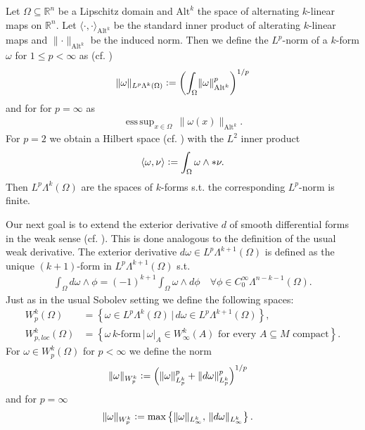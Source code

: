 \documentclass[12pt,a4paper]{article}
\theoremstyle{definition}
\DeclareMathOperator*{\esssup}{ess\,sup}
\newcommand{\norm}[1]{\lVert #1 \rVert}
\newcommand{\real}{\mathbb{R}}
\begin{document}
Let $\Omega \subseteq \real^n$ be a Lipschitz domain and $\text{Alt}^k$ 
the space of alternating $k$-linear maps on $\real^n$. 
Let $\langle \cdot,\cdot\rangle_{\text{Alt}^k}$ be the standard inner
product of alterating $k$-linear maps and 
$\lVert \cdot \rVert _{\text{Alt}^k}$ be the induced norm. Then
we define the $L^p$-norm of a $k$-form $\omega$ for $1\leq p < \infty$
as (cf. \cite{goldshtein})
\begin{align*}
\lVert \omega \rVert _{L^p\Lambda^k(\Omega)}\vcentcolon=
\left(\int_\Omega \lVert \omega \rVert _{\text{Alt}^k}^p \right)^{1/p}
\end{align*}
and for for $p=\infty$ as
\begin{align*}
\esssup_{x\in \Omega} \, \lVert \omega(x) \rVert _{{\text{Alt}^k}}.
\end{align*}
For $p=2$ we obtain a Hilbert space (cf. \cite[Sec. 6.2.6]{arnold}) 
with the $L^2$ inner product  
\begin{align*}
\langle \omega, \nu \rangle \vcentcolon= \int_\Omega \omega \wedge *\nu.
\end{align*}
Then $L^p\Lambda^k(\Omega)$ are the spaces of $k$-forms 
s.t. the corresponding $L^p$-norm is finite. \par

Our next goal is to extend the exterior derivative $d$ 
of smooth differential forms in the weak sense (cf. \cite{goldshtein}). 
This is done analogous to the definition of the usual weak derivative.
The exterior derivative $d\omega \in L^p\Lambda^{k+1}(\Omega)$ is defined as
the unique $(k+1)$-form in $L^p\Lambda^{k+1}(\Omega)$ s.t. 
\begin{align*}
\int_\Omega d\omega \wedge \phi = (-1)^{k+1}\int_\Omega \omega \wedge d\phi
\quad \forall \phi \in C_0^\infty \Lambda^{n-k-1}(\Omega).
\end{align*}
Just as in the usual Sobolev setting we define the following spaces:
\begin{align*}
W^k_p(\Omega) &= \left\{ \omega \in L^p\Lambda^k(\Omega)\, | 
\, d\omega \in L^p\Lambda^{k+1}(\Omega) \right\}, \\ %
W^k_{p,loc}(\Omega) &= \left\{ \omega \, k \text{-form} \, | \,
\omega|_A \in W^k_\infty(A) \text{ for every } A \subseteq M \text{ compact} 
\right\}.
\end{align*}
For $\omega \in W^k_p(\Omega)$ for $p<\infty$ we define the norm 
\begin{align*}
\lVert \omega \rVert _{W^k_p} &\vcentcolon= 
\left( \norm{\omega}^p_{L^k_p} + \norm{d\omega}^p_{L^k_p} \right)^{1/p}
\end{align*}
and for $p=\infty$
\begin{align*}
    \lVert \omega \rVert _{W^k_p} &\vcentcolon= 
    \max\left\{ \norm{\omega}_{L^k_\infty},\, \norm{d\omega}_{L^k_\infty}
    \right\}.
\end{align*}
    
\end{document}
